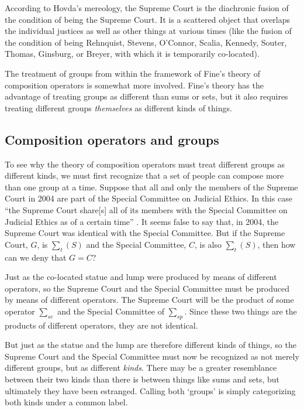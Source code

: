 \documentclass[11pt]{article}
\begin{document}
\begin{spacing}{1.5}
According to Hovda's mereology, the Supreme Court is the diachronic
fusion of the condition of being the Supreme Court.  It is a scattered
object that overlaps the individual justices as well as other things
at various times (like the fusion of the condition of being Rehnquist,
Stevens, O'Connor, Scalia, Kennedy, Souter, Thomas, Ginsburg, or
Breyer, with which it is temporarily co-located).

The treatment of groups from within the framework of Fine's theory of
composition operators is somewhat more involved.  Fine's theory has
the advantage of treating groups as different than sums or sets, but
it also requires treating different groups {\em themselves} as
different kinds of things.

\subsection{Composition operators and groups}
\label{group-fine}
To see why the theory of composition operators must treat different
groups as different kinds, we must first recognize that a set of
people can compose more than one group at a time.  Suppose that all
and only the members of the Supreme Court in 2004 are part of the
Special Committee on Judicial Ethics.  In this case ``the Supreme
Court share[s] all of its members with the Special Committee on
Judicial Ethics as of a certain time'' \citep[151]{uzquiano2004a}.  It
seems false to say that, in 2004, the Supreme Court was identical with
the Special Committee.  But if the Supreme Court, $G$, is $\sum _{t} (
S )$ and the Special Committee, $C$, is also $\sum _{t} ( S )$, then
how can we deny that $G = C$?

Just as the co-located statue and lump were produced by means of
different operators, so the Supreme Court and the Special Committee
must be produced by means of different operators.  The Supreme Court
will be the product of some operator $\sum _{sc}$ and the Special
Committee of $\sum _{sp}$.  Since these two things are the products of
different operators, they are not identical.

But just as the statue and the lump are therefore different kinds of
things, so the Supreme Court and the Special Committee must now be
recognized as not merely different groups, but as different {\em
  kinds}.  There may be a greater resemblance between their two kinds
than there is between things like sums and sets, but ultimately they
have been estranged.  Calling both `groups' is simply categorizing
both kinds under a common label.


\end{spacing}
\end{document}

